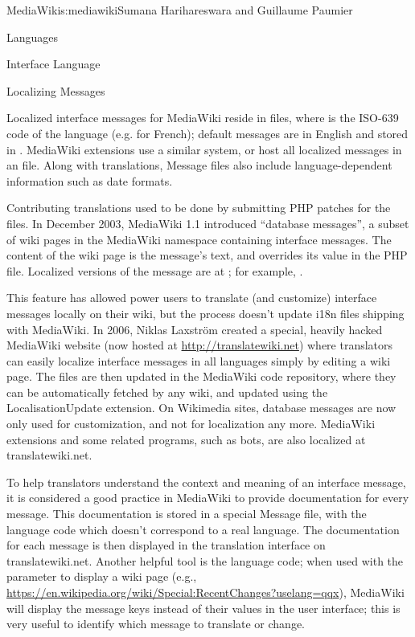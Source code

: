 \begin{aosachapter}{MediaWiki}{s:mediawiki}{Sumana Harihareswara and Guillaume Paumier}
\begin{aosasect1}{Languages}
\begin{aosasect2}{Interface Language}
\end{aosasect2}

\begin{aosasect2}{Localizing Messages}

Localized interface messages for MediaWiki reside in
 files, where  is the ISO-639 code of
the language (e.g.  for French); default messages
are in English and stored in . MediaWiki
extensions use a similar system, or host all localized messages in an
 file. Along
with translations, Message files also include language-dependent
information such as date formats.

Contributing translations used to be done by submitting PHP patches
for the  files. In December 2003, MediaWiki 1.1
introduced ``database messages'', a subset of wiki pages in the
MediaWiki namespace containing interface messages. The content of the
wiki page \linebreak
{} is the
message's text, and overrides its value in the PHP file. Localized
versions of the message are at
;
for example, \linebreak
{}.

This feature has allowed power users to translate (and customize)
interface messages locally on their wiki, but the process doesn't
update i18n files shipping with MediaWiki. In 2006, Niklas Laxstr\"{o}m
created a special, heavily hacked MediaWiki website (now hosted at \linebreak
\url{http://translatewiki.net}) where translators can easily localize
interface messages in all languages simply by editing a wiki
page. The  files are then updated in the
MediaWiki code repository, where they can be automatically fetched by
any wiki, and updated using the LocalisationUpdate extension. On
Wikimedia sites, database messages are now only used for
customization, and not for localization any more. MediaWiki extensions
and some related programs, such as bots, are also localized at
translatewiki.net.

To help translators understand the context and meaning of an interface
message, it is considered a good practice in MediaWiki to provide
documentation for every message. This documentation is stored in a
special Message file, with the  language code which doesn't
correspond to a real language. The documentation for each message is
then displayed in the translation interface on
translatewiki.net. Another helpful tool is the  language
code; when used with the  parameter to display a
wiki page (e.g.,
\url{https://en.wikipedia.org/wiki/Special:RecentChanges?uselang=qqx}),
MediaWiki will display the message keys instead of their values in the
user interface; this is very useful to identify which message to
translate or change.


\end{aosasect2}
\end{aosasect1}
\end{aosachapter}

